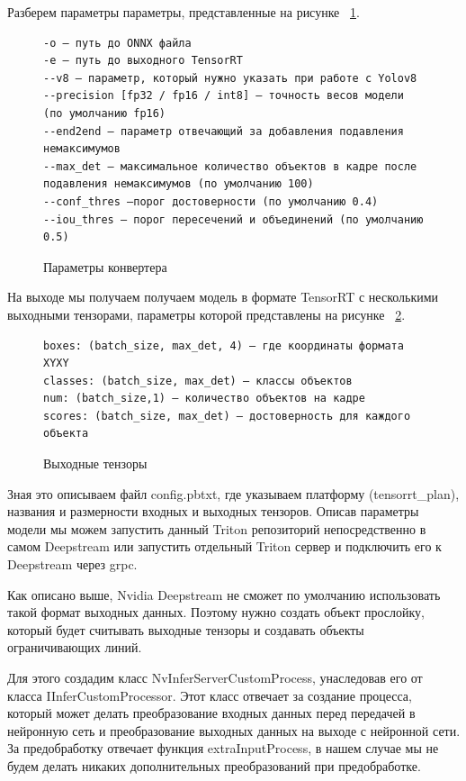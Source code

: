 Разберем параметры параметры, представленные на рисунке ~\ref{src:src2_2}.
\begin{figure}
\begin{lstlisting}
-o — путь до ONNX файла
-e — путь до выходного TensorRT
--v8 — параметр, который нужно указать при работе с Yolov8
--precision [fp32 / fp16 / int8] — точность весов модели (по умолчанию fp16)
--end2end — параметр отвечающий за добавления подавления немаксимумов
--max_det — максимальное количество объектов в кадре после подавления немаксимумов (по умолчанию 100)
--conf_thres —порог достоверности (по умолчанию 0.4)
--iou_thres — порог пересечений и объединений (по умолчанию 0.5)
\end{lstlisting}
\caption{Параметры конвертера}
\label{src:src2_2}
\end{figure}

На выходе мы получаем получаем модель в формате TensorRT с несколькими выходными тензорами, параметры которой представлены на рисунке ~\ref{src:src2_3}.

\begin{figure}
\begin{lstlisting}
boxes: (batch_size, max_det, 4) — где координаты формата XYXY
classes: (batch_size, max_det) — классы объектов
num: (batch_size,1) — количество объектов на кадре
scores: (batch_size, max_det) — достоверность для каждого объекта
\end{lstlisting}
\caption{Выходные тензоры}
\label{src:src2_3}
\end{figure}

Зная это описываем файл config.pbtxt, где указываем платформу (tensorrt\_plan), названия и размерности входных и выходных тензоров. Описав параметры модели мы можем запустить данный Triton репозиторий непосредственно в самом Deepstream или запустить отдельный Triton сервер и подключить его к Deepstream через grpc.

Как описано выше, Nvidia Deepstream не сможет по умолчанию использовать такой формат выходных данных. Поэтому нужно создать объект прослойку, который будет считывать выходные тензоры и создавать объекты ограничивающих линий.

Для этого создадим класс NvInferServerCustomProcess, унаследовав его от класса IInferCustomProcessor. Этот класс отвечает за создание процесса, который может делать преобразование входных данных перед передачей в нейронную сеть и преобразование выходных данных на выходе с нейронной сети. За предобработку отвечает функция extraInputProcess, в нашем случае мы не будем делать никаких дополнительных преобразований при предобработке. 

